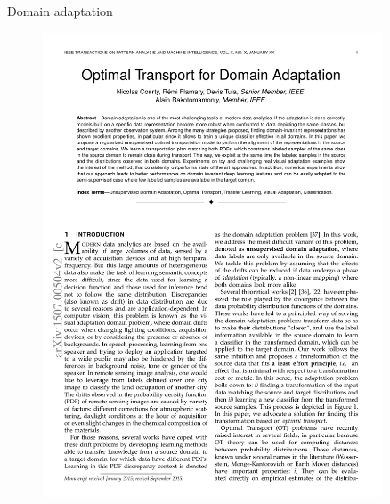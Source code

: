 \documentclass[pdf,aspectratio=169,10pt]{beamer}
\begin{document}
\begin{frame}{  Domain  adaptation}

\begin{minipage}{0.49\textwidth}
\vspace{1em}
    \begin{figure}
        \includegraphics[trim={1.5cm 20.5cm 2cm 1.5cm},clip, page=2, width=0.9\textwidth]{../img/OT4DA}\hfill
    \end{figure}
\vspace{-0.5em}
    \begin{figure}

\end{figure}
\end{minipage}
\end{frame}
\end{document}
